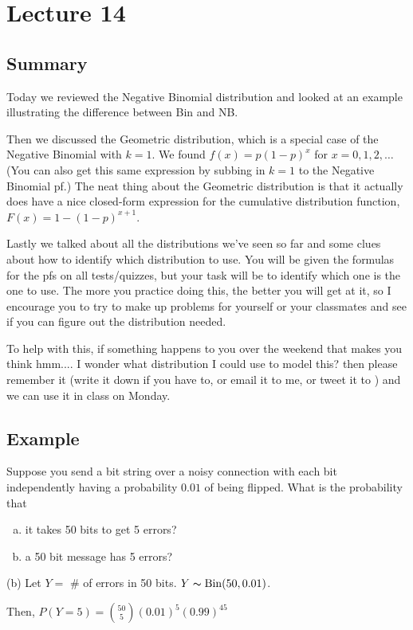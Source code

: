 \section{Lecture 14}
\subsection{Summary}
Today we reviewed the Negative Binomial distribution and looked at an example illustrating the difference between Bin and NB.

Then we discussed the Geometric distribution, which is a special case of the Negative Binomial with $k=1$. We found $f(x)=p(1-p)^x$ for $x = 0,1,2,\ldots$ (You can also get this same expression by subbing in $k=1$ to the Negative Binomial pf.) The neat thing about the Geometric distribution is that it actually does have a nice closed-form expression for the cumulative distribution function, $F(x)=1-(1-p)^{x+1}$.

Lastly we talked about all the distributions we've seen so far and some clues about how to identify which distribution to use. You will be given the formulas for the pfs on all tests/quizzes, but your task will be to identify which one is the one to use. The more you practice doing this, the better you will get at it, so I encourage you to try to make up problems for yourself or your classmates and see if you can figure out the distribution needed.

To help with this, if something happens to you over the weekend that makes you think hmm.... I wonder what distribution I could use to model this? then please remember it (write it down if you have to, or email it to me, or tweet it to \@ActSciProf) and we can use it in class on Monday.

\subsection{Example}
Suppose you send a bit string over a noisy connection with
each bit independently having a probability $ 0.01 $ of being
flipped. What is the probability that
\begin{enumerate}[(a)]
    \item it takes 50 bits to get 5 errors?
    \item a 50 bit message has 5 errors?
\end{enumerate}

(b) Let $ Y= $ \# of errors in 50 bits. $ Y\thicksim\operatorname{Bin}(50,0.01) $.

Then, $ P(Y=5)=\binom{50}{5}(0.01)^5(0.99)^{45} $

